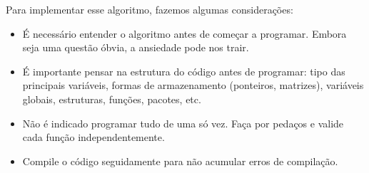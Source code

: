 Para implementar esse algoritmo, fazemos algumas considerações:
\begin{itemize}
 \item É necessário entender o algoritmo antes de começar a programar. Embora seja uma questão óbvia, a ansiedade pode nos trair.
 \item É importante pensar na estrutura do código antes de programar: tipo das principais variáveis, formas de armazenamento (ponteiros, matrizes), variáveis globais, estruturas, funções, pacotes, etc.
 \item Não é indicado programar tudo de uma só vez. Faça por pedaços e valide cada função independentemente.
 \item Compile o código seguidamente para não acumular erros de compilação.
\end{itemize}

